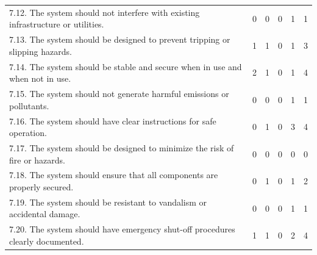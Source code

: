 \documentclass[12pt]{report}
\begin{document}
\begin{table}[H]
\begin{tabular}{|p{10cm}|c|c|c|c|c|}
7.12. The system should not interfere with existing infrastructure or utilities. & 0 & 0 & 0 & 1 & 1 \\
7.13. The system should be designed to prevent tripping or slipping hazards. & 1 & 1 & 0 & 1 & 3 \\
7.14. The system should be stable and secure when in use and when not in use. & 2 & 1 & 0 & 1 & 4 \\
7.15. The system should not generate harmful emissions or pollutants. & 0 & 0 & 0 & 1 & 1 \\
7.16. The system should have clear instructions for safe operation. & 0 & 1 & 0 & 3 & 4 \\
7.17. The system should be designed to minimize the risk of fire or hazards. & 0 & 0 & 0 & 0 & 0 \\
7.18. The system should ensure that all components are properly secured. & 0 & 1 & 0 & 1 & 2 \\
7.19. The system should be resistant to vandalism or accidental damage. & 0 & 0 & 0 & 1 & 1 \\
7.20. The system should have emergency shut-off procedures clearly documented. & 1 & 1 & 0 & 2 & 4 \\
\hline
\end{tabular}
\end{table}
\renewcommand{\thetable}{\thechapter.\arabic{table}}
\setcounter{table}{1}
\end{document}
